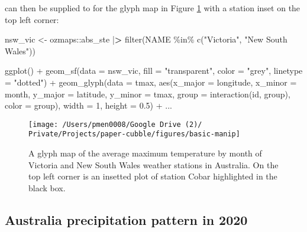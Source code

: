 \documentclass{article}
\newenvironment{Shaded}{\begin{snugshade}}{\end{snugshade}}
\newcommand{\AttributeTok}[1]{\textcolor[rgb]{0.77,0.63,0.00}{#1}}
\newcommand{\DecValTok}[1]{\textcolor[rgb]{0.00,0.00,0.81}{#1}}
\newcommand{\ErrorTok}[1]{\textcolor[rgb]{0.64,0.00,0.00}{\textbf{#1}}}
\newcommand{\FloatTok}[1]{\textcolor[rgb]{0.00,0.00,0.81}{#1}}
\newcommand{\FunctionTok}[1]{\textcolor[rgb]{0.00,0.00,0.00}{#1}}
\newcommand{\NormalTok}[1]{#1}
\newcommand{\OtherTok}[1]{\textcolor[rgb]{0.56,0.35,0.01}{#1}}
\newcommand{\SpecialCharTok}[1]{\textcolor[rgb]{0.00,0.00,0.00}{#1}}
\newcommand{\StringTok}[1]{\textcolor[rgb]{0.31,0.60,0.02}{#1}}
\begin{document}
 can then be supplied to  for the glyph map in Figure \ref{fig:basic-manip} with a station inset on the top left corner:

\begin{Shaded}
\begin{Highlighting}[]
\NormalTok{nsw\_vic }\OtherTok{\textless{}{-}}\NormalTok{ ozmaps}\SpecialCharTok{::}\NormalTok{abs\_ste }\SpecialCharTok{|}\ErrorTok{\textgreater{}}
  \FunctionTok{filter}\NormalTok{(NAME }\SpecialCharTok{\%in\%} \FunctionTok{c}\NormalTok{(}\StringTok{"Victoria"}\NormalTok{, }\StringTok{"New South Wales"}\NormalTok{))}

\FunctionTok{ggplot}\NormalTok{() }\SpecialCharTok{+}
  \FunctionTok{geom\_sf}\NormalTok{(}\AttributeTok{data =}\NormalTok{ nsw\_vic,}
          \AttributeTok{fill =} \StringTok{"transparent"}\NormalTok{, }\AttributeTok{color =} \StringTok{"grey"}\NormalTok{, }\AttributeTok{linetype =} \StringTok{"dotted"}\NormalTok{) }\SpecialCharTok{+}
  \FunctionTok{geom\_glyph}\NormalTok{(}\AttributeTok{data =}\NormalTok{ tmax,}
             \FunctionTok{aes}\NormalTok{(}\AttributeTok{x\_major =}\NormalTok{ longitude, }\AttributeTok{x\_minor =}\NormalTok{ month,}
                 \AttributeTok{y\_major =}\NormalTok{ latitude, }\AttributeTok{y\_minor =}\NormalTok{ tmax,}
                 \AttributeTok{group =} \FunctionTok{interaction}\NormalTok{(id, group), }\AttributeTok{color =}\NormalTok{ group),}
             \AttributeTok{width =} \DecValTok{1}\NormalTok{, }\AttributeTok{height =} \FloatTok{0.5}\NormalTok{) }\SpecialCharTok{+}
\NormalTok{  ...}
\end{Highlighting}
\end{Shaded}

\begin{figure}
\texttt{[image: /Users/pmen0008/Google Drive (2)/ Private/Projects/paper-cubble/figures/basic-manip]} \caption{A glyph map of the average maximum temperature by month of Victoria and New South Wales weather stations in Australia. On the top left corner is an insetted plot of station Cobar highlighted in the black box.}\label{fig:basic-manip}
\end{figure}

\hypertarget{australia-precipitation-pattern-in-2020}{%
\subsection{Australia precipitation pattern in 2020}\label{australia-precipitation-pattern-in-2020}}
\end{document}
